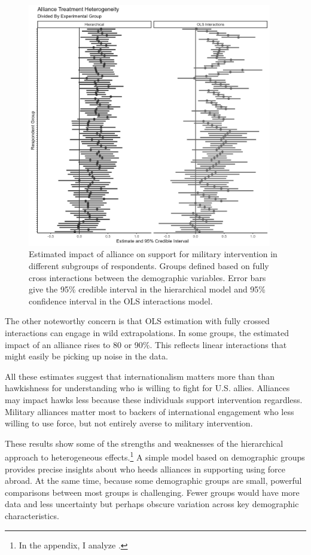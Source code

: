 \documentclass[12pt]{article}
\begin{document}
\begin{figure}[htpb]
	\centering
		\includegraphics[width=0.95\textwidth]{../figures/tw-treat-het-comp.png}
	\caption{Estimated impact of alliance on support for military intervention in different subgroups of respondents. Groups defined based on fully cross interactions between the demographic variables. Error bars give the 95\% credible interval in the hierarchical model and 95\% confidence interval in the OLS interactions model.}
	\label{fig:tw-treat-het-comp}
\end{figure}


The other noteworthy concern is that OLS estimation with fully crossed interactions can engage in wild extrapolations.
In some groups, the estimated impact of an alliance rises to 80 or 90\%. 
This reflects linear interactions that might easily be picking up noise in the data.


All these estimates suggest that internationalism matters more than than hawkishness for understanding who is willing to fight for U.S. allies. 
Alliances may impact hawks less because these individuals support intervention regardless. 
Military alliances matter most to backers of international engagement who less willing to use force, but not entirely averse to military intervention.


These results show some of the strengths and weaknesses of the hierarchical approach to heterogeneous effects.\footnote{In the appendix, I analyze \citet{BushPrather2020}.}
A simple model based on demographic groups provides precise insights about who heeds alliances in supporting using force abroad. 
At the same time, because some demographic groups are small, powerful comparisons between most groups is challenging. 
Fewer groups would have more data and less uncertainty but perhaps obscure variation across key demographic characteristics. 
\end{document}
